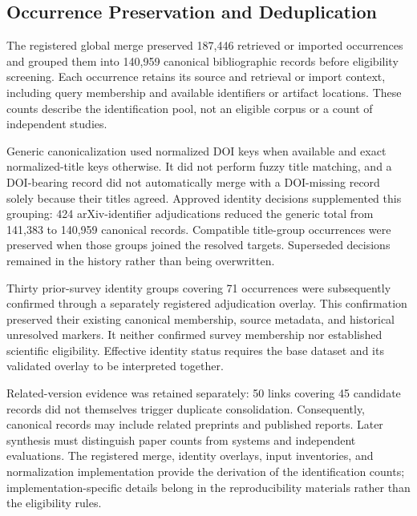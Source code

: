 
\subsection{Occurrence Preservation and Deduplication}
\label{sec:methodology-deduplication}

The registered global merge preserved 187,446 retrieved or imported occurrences and grouped them into 140,959 canonical bibliographic records before eligibility screening. Each occurrence retains its source and retrieval or import context, including query membership and available identifiers or artifact locations. These counts describe the identification pool, not an eligible corpus or a count of independent studies.

Generic canonicalization used normalized DOI keys when available and exact normalized-title keys otherwise. It did not perform fuzzy title matching, and a DOI-bearing record did not automatically merge with a DOI-missing record solely because their titles agreed. Approved identity decisions supplemented this grouping: 424 arXiv-identifier adjudications reduced the generic total from 141,383 to 140,959 canonical records. Compatible title-group occurrences were preserved when those groups joined the resolved targets. Superseded decisions remained in the history rather than being overwritten.

Thirty prior-survey identity groups covering 71 occurrences were subsequently confirmed through a separately registered adjudication overlay. This confirmation preserved their existing canonical membership, source metadata, and historical unresolved markers. It neither confirmed survey membership nor established scientific eligibility. Effective identity status requires the base dataset and its validated overlay to be interpreted together.

Related-version evidence was retained separately: 50 links covering 45 candidate records did not themselves trigger duplicate consolidation. Consequently, canonical records may include related preprints and published reports. Later synthesis must distinguish paper counts from systems and independent evaluations. The registered merge, identity overlays, input inventories, and normalization implementation provide the derivation of the identification counts; implementation-specific details belong in the reproducibility materials rather than the eligibility rules.

